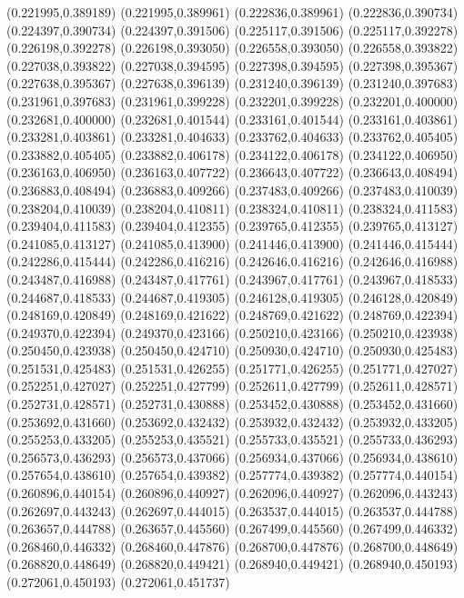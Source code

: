 (0.221995,0.389189)
(0.221995,0.389961)
(0.222836,0.389961)
(0.222836,0.390734)
(0.224397,0.390734)
(0.224397,0.391506)
(0.225117,0.391506)
(0.225117,0.392278)
(0.226198,0.392278)
(0.226198,0.393050)
(0.226558,0.393050)
(0.226558,0.393822)
(0.227038,0.393822)
(0.227038,0.394595)
(0.227398,0.394595)
(0.227398,0.395367)
(0.227638,0.395367)
(0.227638,0.396139)
(0.231240,0.396139)
(0.231240,0.397683)
(0.231961,0.397683)
(0.231961,0.399228)
(0.232201,0.399228)
(0.232201,0.400000)
(0.232681,0.400000)
(0.232681,0.401544)
(0.233161,0.401544)
(0.233161,0.403861)
(0.233281,0.403861)
(0.233281,0.404633)
(0.233762,0.404633)
(0.233762,0.405405)
(0.233882,0.405405)
(0.233882,0.406178)
(0.234122,0.406178)
(0.234122,0.406950)
(0.236163,0.406950)
(0.236163,0.407722)
(0.236643,0.407722)
(0.236643,0.408494)
(0.236883,0.408494)
(0.236883,0.409266)
(0.237483,0.409266)
(0.237483,0.410039)
(0.238204,0.410039)
(0.238204,0.410811)
(0.238324,0.410811)
(0.238324,0.411583)
(0.239404,0.411583)
(0.239404,0.412355)
(0.239765,0.412355)
(0.239765,0.413127)
(0.241085,0.413127)
(0.241085,0.413900)
(0.241446,0.413900)
(0.241446,0.415444)
(0.242286,0.415444)
(0.242286,0.416216)
(0.242646,0.416216)
(0.242646,0.416988)
(0.243487,0.416988)
(0.243487,0.417761)
(0.243967,0.417761)
(0.243967,0.418533)
(0.244687,0.418533)
(0.244687,0.419305)
(0.246128,0.419305)
(0.246128,0.420849)
(0.248169,0.420849)
(0.248169,0.421622)
(0.248769,0.421622)
(0.248769,0.422394)
(0.249370,0.422394)
(0.249370,0.423166)
(0.250210,0.423166)
(0.250210,0.423938)
(0.250450,0.423938)
(0.250450,0.424710)
(0.250930,0.424710)
(0.250930,0.425483)
(0.251531,0.425483)
(0.251531,0.426255)
(0.251771,0.426255)
(0.251771,0.427027)
(0.252251,0.427027)
(0.252251,0.427799)
(0.252611,0.427799)
(0.252611,0.428571)
(0.252731,0.428571)
(0.252731,0.430888)
(0.253452,0.430888)
(0.253452,0.431660)
(0.253692,0.431660)
(0.253692,0.432432)
(0.253932,0.432432)
(0.253932,0.433205)
(0.255253,0.433205)
(0.255253,0.435521)
(0.255733,0.435521)
(0.255733,0.436293)
(0.256573,0.436293)
(0.256573,0.437066)
(0.256934,0.437066)
(0.256934,0.438610)
(0.257654,0.438610)
(0.257654,0.439382)
(0.257774,0.439382)
(0.257774,0.440154)
(0.260896,0.440154)
(0.260896,0.440927)
(0.262096,0.440927)
(0.262096,0.443243)
(0.262697,0.443243)
(0.262697,0.444015)
(0.263537,0.444015)
(0.263537,0.444788)
(0.263657,0.444788)
(0.263657,0.445560)
(0.267499,0.445560)
(0.267499,0.446332)
(0.268460,0.446332)
(0.268460,0.447876)
(0.268700,0.447876)
(0.268700,0.448649)
(0.268820,0.448649)
(0.268820,0.449421)
(0.268940,0.449421)
(0.268940,0.450193)
(0.272061,0.450193)
(0.272061,0.451737)
